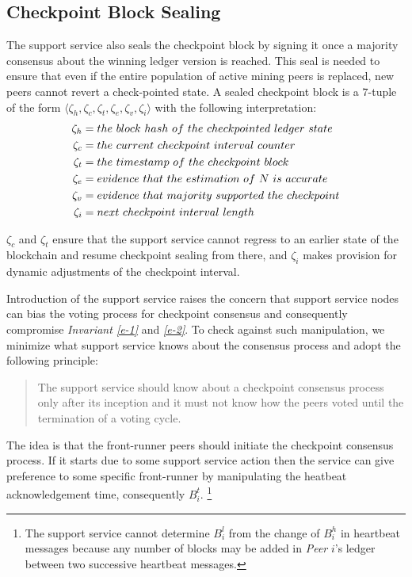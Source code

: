 \subsection{Checkpoint Block Sealing}
The support service also seals the checkpoint block by signing it once a majority consensus about the winning ledger version is reached. This seal is needed to ensure that even if the entire population of active mining peers is replaced, new peers cannot revert a check-pointed state. A sealed checkpoint block is a $7$-tuple of the form $\langle \zeta_h, \zeta_c, \zeta_t, \zeta_e, \zeta_v, \zeta_i \rangle$ with the following interpretation:
\begin{equation*}
\begin{split}
	\zeta_h & = the\ block\ hash\ of\ the\ check\-pointed\ ledger\ state \\
	\zeta_c & = the\ current\ checkpoint\ interval\ counter \\
	\zeta_t & = the\ timestamp\ of\ the\ checkpoint\ block \\
	\zeta_e & = evidence\ that\ the\ estimation\ of\ N\ is\ accurate \\
	\zeta_v & = evidence\ that\ majority\ supported\ the\ checkpoint \\
	\zeta_i & = next\ checkpoint\ interval\ length
\end{split}
\end{equation*}

$\zeta_c$ and $\zeta_t$ ensure that the support service cannot regress to an earlier state of the blockchain and resume checkpoint sealing from there, and $\zeta_i$ makes provision for dynamic adjustments of the checkpoint interval.

Introduction of the support service raises the concern that support service nodes can bias the voting process for checkpoint consensus and consequently compromise \textit{Invariant \ref{e-1}} and \textit{\ref{e-2}}. To check against such manipulation, we minimize what support service knows about the consensus process and adopt the following principle:

\begin{quote}
The support service should know about a checkpoint consensus process only after its inception and it must not know how the peers voted until the termination of a voting cycle.         
\end{quote}

The idea is that the front-runner peers should initiate the checkpoint consensus process. If it starts due to some support service action then the service can give preference to some specific front-runner by manipulating the heatbeat acknowledgement time, consequently $B_i^t$. \footnote{The support service cannot determine $B_i^l$ from the change of $B_i^h$ in heartbeat messages because any number of blocks may be added in \textit{Peer} $i$'s ledger between two successive heartbeat messages.}

